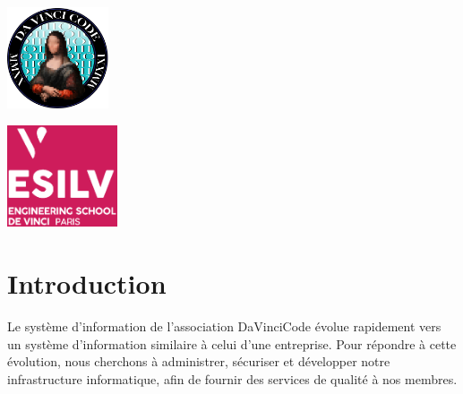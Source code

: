 \documentclass[12pt]{article}
\begin{document}
	
	\backgroundpages
	\setlength{\columnsep}{-4cm}
	\begin{multicols}{3}\raggedbottom\color{white}
		\noindent
		\parbox[t][45mm][t]{\columnwidth}{\setlength{\parindent}{1em}
			\vspace*{-18mm}
			\includegraphics[height=30mm]{davincicode}
		}
		
		\noindent
		\parbox[c][40mm][c]{\columnwidth}{\setlength{\parindent}{0em}
			\centering
			\shadowoffsetx{1pt}
			\shadowoffsety{0pt}
			\vspace*{-38mm}
			\vspace{0.7cm}
			\vspace{0.2cm}
		}
		
		\parbox[t][45mm][t]{\columnwidth}{\setlength{\parindent}{12em}
			\vspace*{-18mm}
			\includegraphics[height=30mm]{esilv}
		}
		
		
	\end{multicols}
	\vspace*{-30mm}
	\raggedbottom
	
	\section{Introduction}   
	Le système d'information de l'association DaVinciCode évolue rapidement vers un système d'information similaire à celui d'une entreprise. Pour répondre à cette évolution, nous cherchons à administrer, sécuriser et développer notre infrastructure informatique, afin de fournir des services de qualité à nos membres.
	\bigskip
	
\end{document}
